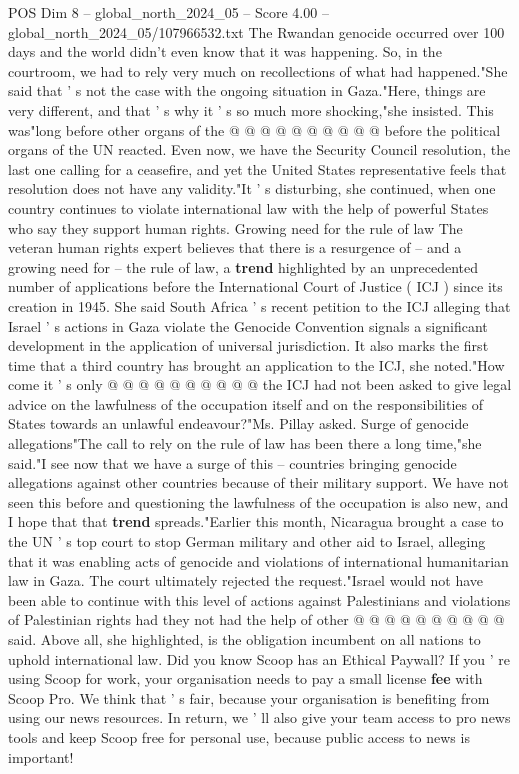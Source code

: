 \begin{textsample}{POS Dim 8 – global\_north\_2024\_05 – Score 4.00 – global\_north\_2024\_05/107966532.txt}
The Rwandan genocide occurred over 100 days and the world didn't even know that it was happening.
So, in the courtroom, we had to rely very much on recollections of what had happened."She said that ' s not the case with the ongoing situation in Gaza."Here, things are very different, and that ' s why it ' s so much more shocking,"she insisted.
This was"long before other organs of the @ @ @ @ @ @ @ @ @ @ before the political organs of the UN reacted.
Even now, we have the Security Council resolution, the last one calling for a ceasefire, and yet the United States representative feels that resolution does not have any validity."It ' s disturbing, she continued, when one country continues to violate international law with the help of powerful States who say they support human rights.
Growing need for the rule of law The veteran human rights expert believes that there is a resurgence of -- and a growing need for -- the rule of law, a \textbf{trend} highlighted by an unprecedented number of applications before the International Court of Justice ( ICJ ) since its creation in 1945.
She said South Africa ' s recent petition to the ICJ alleging that Israel ' s actions in Gaza violate the Genocide Convention signals a significant development in the application of universal jurisdiction.
It also marks the first time that a third country has brought an application to the ICJ, she noted."How come it ' s only @ @ @ @ @ @ @ @ @ @ the ICJ had not been asked to give legal advice on the lawfulness of the occupation itself and on the responsibilities of States towards an unlawful endeavour?"Ms.
Pillay asked.
Surge of genocide allegations"The call to rely on the rule of law has been there a long time,"she said."I see now that we have a surge of this -- countries bringing genocide allegations against other countries because of their military support.
We have not seen this before and questioning the lawfulness of the occupation is also new, and I hope that that \textbf{trend} spreads."Earlier this month, Nicaragua brought a case to the UN ' s top court to stop German military and other aid to Israel, alleging that it was enabling acts of genocide and violations of international humanitarian law in Gaza.
The court ultimately rejected the request."Israel would not have been able to continue with this level of actions against Palestinians and violations of Palestinian rights had they not had the help of other @ @ @ @ @ @ @ @ @ @ said.
Above all, she highlighted, is the obligation incumbent on all nations to uphold international law.
Did you know Scoop has an Ethical Paywall?
If you ' re using Scoop for work, your organisation needs to pay a small license \textbf{fee} with Scoop Pro.
We think that ' s fair, because your organisation is benefiting from using our news resources.
In return, we ' ll also give your team access to pro news tools and keep Scoop free for personal use, because public access to news is important!

\end{textsample}

